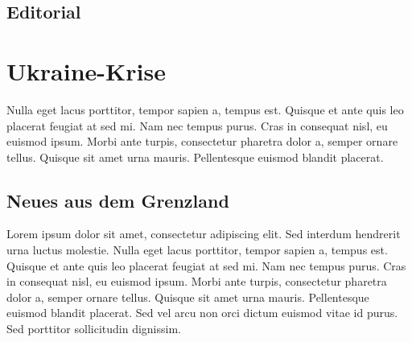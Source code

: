 \documentclass{freistuz}
\begin{document}
 
\renewcommand{\contentsname}{Inhalt}

\begin{multicols}{2}


\tableofcontents
	\vfill
	\columnbreak
\section{Editorial}
\begin{shaded}
\blindtext[1]
\end{shaded}
\end{multicols}

\section{Ukraine-Krise}
\begin{multicols}{2}
Nulla eget lacus porttitor, tempor sapien a, tempus est. Quisque et ante quis leo placerat feugiat at sed mi. Nam nec tempus purus. Cras in consequat nisl, eu euismod ipsum. Morbi ante turpis, consectetur pharetra dolor a, semper ornare tellus. Quisque sit amet urna mauris. Pellentesque euismod blandit placerat.
\subsection{Neues aus dem Grenzland}
Lorem ipsum dolor sit amet, consectetur adipiscing elit. Sed interdum hendrerit urna luctus molestie. Nulla eget lacus porttitor, tempor sapien a, tempus est. Quisque et ante quis leo placerat feugiat at sed mi. Nam nec tempus purus. Cras in consequat nisl, eu euismod ipsum. Morbi ante turpis, consectetur pharetra dolor a, semper ornare tellus. Quisque sit amet urna mauris. Pellentesque euismod blandit placerat. Sed vel arcu non orci dictum euismod vitae id purus. Sed porttitor sollicitudin dignissim. 

\end{multicols}
\end{document}
